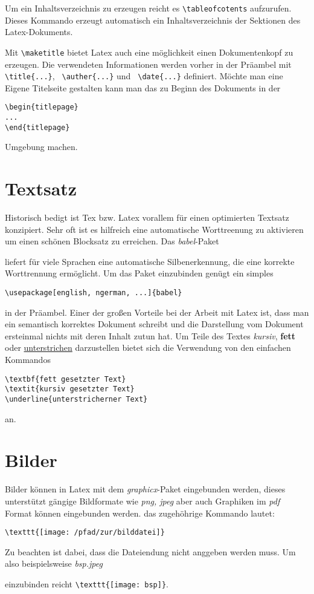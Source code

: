 \documentclass[a4paper, parskip=half]{scrartcl}
\newcommand{\myPackage}[1]{%
  \textit{#1}-Paket%
}
\newcommand{\myFormat}[1]{%
  \textit{#1}%
}
\newcommand{\myPath}[1]{%
  \textit{#1}%
}
\begin{document}
Um ein Inhaltsverzeichnis zu erzeugen reicht es \verb+\tableofcotents+ aufzurufen. Dieses Kommando erzeugt
automatisch ein Inhaltsverzeichnis der Sektionen des Latex-Dokuments.

Mit \verb+\maketitle+ bietet Latex auch eine möglichkeit einen Dokumentenkopf zu erzeugen. Die verwendeten
Informationen werden vorher in der Präambel mit \verb+\title{...}+, \verb+ \auther{...}+ und
\verb+ \date{...}+ definiert. Möchte man eine Eigene Titelseite gestalten kann man das zu Beginn des Dokuments
in der 
\begin{verbatim}
\begin{titlepage}
...
\end{titlepage}
\end{verbatim}
Umgebung machen.

\section{Textsatz}
Historisch bedigt ist Tex bzw. Latex vorallem für einen optimierten Textsatz konzipiert. Sehr oft ist es hilfreich
eine automatische Worttreenung zu aktivieren um einen schönen Blocksatz zu erreichen. Das \myPackage{babel}
liefert für viele Sprachen eine automatische Silbenerkennung, die eine korrekte Worttrennung ermöglicht. Um
das Paket einzubinden genügt ein simples
\begin{verbatim}
\usepackage[english, ngerman, ...]{babel} 
\end{verbatim}
in der Präambel. Einer der großen Vorteile bei der Arbeit mit Latex ist, dass man ein semantisch korrektes
Dokument schreibt und die Darstellung vom Dokument ersteinmal nichts mit deren Inhalt zutun hat. Um Teile
des Textes \textit{kursiv}, \textbf{fett} oder \underline{unterstrichen} darzustellen bietet sich die Verwendung 
von den einfachen Kommandos 
\begin{verbatim}
\textbf{fett gesetzter Text}
\textit{kursiv gesetzter Text}
\underline{unterstricherner Text}
\end{verbatim}
an. 
\section{Bilder}
Bilder können in Latex mit dem \myPackage{graphicx} eingebunden werden, dieses unterstützt gängige
Bildformate wie \myFormat{png, jpeg} aber auch Graphiken im \myFormat{pdf} Format können eingebunden werden.
das zugehöhrige Kommando lautet:
\begin{verbatim}
\texttt{[image: /pfad/zur/bilddatei]}
\end{verbatim}
Zu beachten ist dabei, dass die Dateiendung nicht anggeben werden muss. Um also beispielsweise \myPath{bsp.jpeg}
einzubinden reicht \verb+\texttt{[image: bsp]}+.
\end{document}
